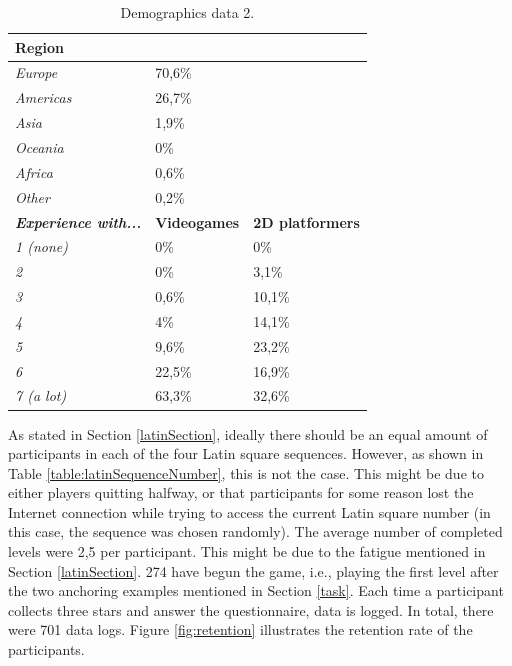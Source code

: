 \begin{table}[h]
\scriptsize
\centering
\begin{tabular}{|l|ll|}
\hline
\textbf{Region}                      &                & \textbf{}               \\ \hline
\textit{Europe}                      & 70,6\%         &                         \\ \hline
\textit{Americas}                    & 26,7\%         &                         \\ \hline
\textit{Asia}                        & 1,9\%          &                         \\ \hline
\textit{Oceania}                     & 0\%            &                         \\ \hline
\textit{Africa}                      & 0,6\%          &                         \\ \hline
\textit{Other}                       & 0,2\%          &                         \\ \hline
\textit{\textbf{Experience with...}} & \textbf{Videogames} & \textbf{2D platformers} \\ \hline
\textit{1 (none)}                           & 0\%            & 0\%                     \\ \hline
\textit{2}                           & 0\%            & 3,1\%                   \\ \hline
\textit{3}                           & 0,6\%          & 10,1\%                  \\ \hline
\textit{4}                           & 4\%            & 14,1\%                  \\ \hline
\textit{5}                           & 9,6\%          & 23,2\%                  \\ \hline
\textit{6}                           & 22,5\%         & 16,9\%                  \\ \hline
\textit{7 (a lot)}                           & 63,3\%         & 32,6\%                  \\ \hline
\end{tabular}
\caption{Demographics data 2.}
\label{table:demographics2}
\end{table}


As stated in Section \ref{latinSection}, ideally there should be an equal amount of participants in each of the four Latin square sequences. However, as shown in Table \ref{table:latinSequenceNumber}, this is not the case. This might be due to either players quitting halfway, or that participants for some reason lost the Internet connection while trying to access the current Latin square number (in this case, the sequence was chosen randomly). The average number of completed levels were 2,5 per participant. This might be due to the fatigue mentioned in Section \ref{latinSection}. 274 have begun the game, i.e., playing the first level after the two anchoring examples mentioned in Section \ref{task}. Each time a participant collects three stars and answer the questionnaire, data is logged. In total, there were 701 data logs. Figure \ref{fig:retention} illustrates the retention rate of the participants.

